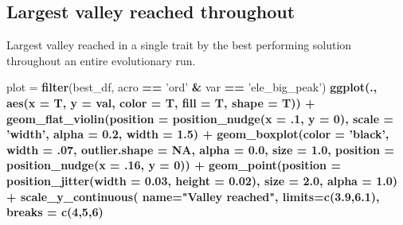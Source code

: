 \documentclass[]{book}
\newenvironment{Shaded}{\begin{snugshade}}{\end{snugshade}}
\newcommand{\DataTypeTok}[1]{\textcolor[rgb]{0.13,0.29,0.53}{#1}}
\newcommand{\DecValTok}[1]{\textcolor[rgb]{0.00,0.00,0.81}{#1}}
\newcommand{\FloatTok}[1]{\textcolor[rgb]{0.00,0.00,0.81}{#1}}
\newcommand{\KeywordTok}[1]{\textcolor[rgb]{0.13,0.29,0.53}{\textbf{#1}}}
\newcommand{\NormalTok}[1]{#1}
\newcommand{\OperatorTok}[1]{\textcolor[rgb]{0.81,0.36,0.00}{\textbf{#1}}}
\newcommand{\OtherTok}[1]{\textcolor[rgb]{0.56,0.35,0.01}{#1}}
\newcommand{\StringTok}[1]{\textcolor[rgb]{0.31,0.60,0.02}{#1}}
\begin{document}
\hypertarget{largest-valley-reached-throughout-1}{%
\subsection{Largest valley reached throughout}\label{largest-valley-reached-throughout-1}}

Largest valley reached in a single trait by the best performing solution throughout an entire evolutionary run.

\begin{Shaded}
\begin{Highlighting}[]
\NormalTok{plot =}\StringTok{ }\KeywordTok{filter}\NormalTok{(best_df, acro }\OperatorTok{==}\StringTok{ 'ord'} \OperatorTok{&}\StringTok{ }\NormalTok{var }\OperatorTok{==}\StringTok{ 'ele_big_peak'}\NormalTok{) }\OperatorTok{%>%}
\StringTok{  }\KeywordTok{ggplot}\NormalTok{(., }\KeywordTok{aes}\NormalTok{(}\DataTypeTok{x =}\NormalTok{ T, }\DataTypeTok{y =}\NormalTok{ val, }\DataTypeTok{color =}\NormalTok{ T, }\DataTypeTok{fill =}\NormalTok{ T, }\DataTypeTok{shape =}\NormalTok{ T)) }\OperatorTok{+}
\StringTok{  }\KeywordTok{geom_flat_violin}\NormalTok{(}\DataTypeTok{position =} \KeywordTok{position_nudge}\NormalTok{(}\DataTypeTok{x =} \FloatTok{.1}\NormalTok{, }\DataTypeTok{y =} \DecValTok{0}\NormalTok{), }\DataTypeTok{scale =} \StringTok{'width'}\NormalTok{, }\DataTypeTok{alpha =} \FloatTok{0.2}\NormalTok{, }\DataTypeTok{width =} \FloatTok{1.5}\NormalTok{) }\OperatorTok{+}
\StringTok{  }\KeywordTok{geom_boxplot}\NormalTok{(}\DataTypeTok{color =} \StringTok{'black'}\NormalTok{, }\DataTypeTok{width =} \FloatTok{.07}\NormalTok{, }\DataTypeTok{outlier.shape =} \OtherTok{NA}\NormalTok{, }\DataTypeTok{alpha =} \FloatTok{0.0}\NormalTok{, }\DataTypeTok{size =} \FloatTok{1.0}\NormalTok{, }\DataTypeTok{position =} \KeywordTok{position_nudge}\NormalTok{(}\DataTypeTok{x =} \FloatTok{.16}\NormalTok{, }\DataTypeTok{y =} \DecValTok{0}\NormalTok{)) }\OperatorTok{+}
\StringTok{  }\KeywordTok{geom_point}\NormalTok{(}\DataTypeTok{position =} \KeywordTok{position_jitter}\NormalTok{(}\DataTypeTok{width =} \FloatTok{0.03}\NormalTok{, }\DataTypeTok{height =} \FloatTok{0.02}\NormalTok{), }\DataTypeTok{size =} \FloatTok{2.0}\NormalTok{, }\DataTypeTok{alpha =} \FloatTok{1.0}\NormalTok{) }\OperatorTok{+}
\StringTok{  }\KeywordTok{scale_y_continuous}\NormalTok{(}
    \DataTypeTok{name=}\StringTok{"Valley reached"}\NormalTok{,}
    \DataTypeTok{limits=}\KeywordTok{c}\NormalTok{(}\FloatTok{3.9}\NormalTok{,}\FloatTok{6.1}\NormalTok{),}
    \DataTypeTok{breaks =} \KeywordTok{c}\NormalTok{(}\DecValTok{4}\NormalTok{,}\DecValTok{5}\NormalTok{,}\DecValTok{6}\NormalTok{)}
}
\end{Highlighting}
\end{Shaded}
\end{document}
